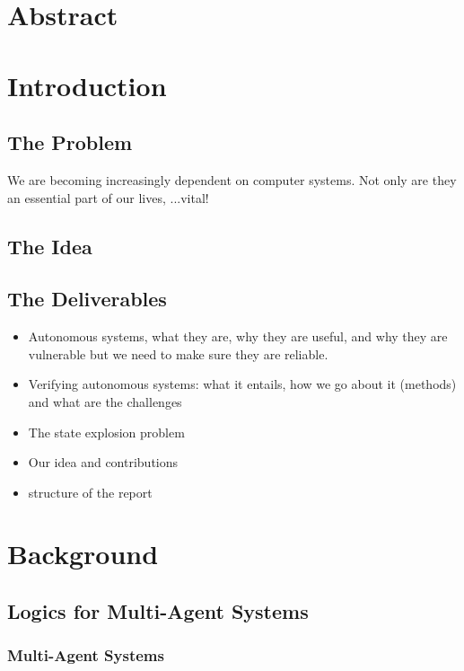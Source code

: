 \documentclass[12]{article}
\begin{document}
\tableofcontents
\section*{Abstract}

\section{Introduction}

\subsection{The Problem}

We are becoming increasingly dependent on computer systems. Not only are they an essential part of our lives, ...vital!



\subsection{The Idea}

\subsection{The Deliverables}


\begin{itemize}
\item Autonomous systems, what they are, why they are useful, and why they are vulnerable but we need to make sure they are reliable.
\item Verifying autonomous systems: what it entails, how we go about it (methods) and what are the challenges
\item The state explosion problem
\item Our idea and contributions
\item structure of the report
\end{itemize}

\section{Background}

\subsection{Logics for Multi-Agent Systems}

\subsubsection{Multi-Agent Systems}
\end{document}
